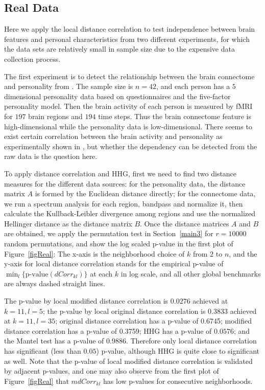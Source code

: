 \documentclass[12pt]{article}
\begin{document}
\subsection{Real Data}
\label{numer2}
Here we apply the local distance correlation to test independence between brain features and personal characteristics from two different experiments, for which the data sets are relatively small in sample size due to the expensive data collection process. 

The first experiment is to detect the relationship between the brain connectome and personality from \cite{AdelsteinEtAl2011}. The sample size is $n=42$, and each person has a $5$ dimensional personality data based on questionnaires and the five-factor personality model. Then the brain activity of each person is measured by fMRI for $197$ brain regions and $194$ time steps. Thus the brain connectome feature is high-dimensional while the personality data is low-dimensional. There seems to exist certain correlation between the brain activity and personality as experimentally shown in \cite{AdelsteinEtAl2011}, but whether the dependency can be detected from the raw data is the question here.

To apply distance correlation and HHG, first we need to find two distance measures for the different data sources: for the personality data, the distance matrix $A$ is formed by the Euclidean distance directly; for the connectome data, we run a spectrum analysis for each region, bandpass and normalize it, then calculate the Kullback-Leibler divergence among regions and use the normalized Hellinger distance as the distance matrix $B$. Once the distance matrices $A$ and $B$ are obtained, we apply the permutation test in Section~\ref{main3} for $r=10000$ random permutations, and show the log scaled p-value in the first plot of Figure~\ref{figReal}: The x-axis is the neighborhood choice of $k$ from $2$ to $n$, and the y-axis for local distance correlation stands for the empirical p-value of $\min_{l} \{\mbox{p-value}(dCorr_{kl})\}$ at each $k$ in log scale, and all other global benchmarks are always dashed straight lines.

The p-value by local modified distance correlation is $0.0276$ achieved at $k=11, l=5$; the p-value by local original distance correlation is $0.3833$ achieved at $k=11, l=35$; original distance correlation has a p-value of 0.6745; modified distance correlation has a p-value of 0.3759; HHG has a p-value of $0.0576$; and the Mantel test has a p-value of $0.9886$. Therefore only local distance correlation has significant (less than $0.05$) p-value, although HHG is quite close to significant as well. Note that the p-value of local modified distance correlation is validated by adjacent p-values, and one may also observe from the first plot of Figure~\ref{figReal} that $mdCorr_{kl}$ has low p-values for consecutive neighborhoods.
\end{document}
